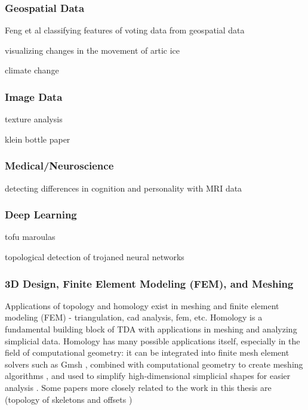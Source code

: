 \documentclass[ma]{uncgdissertationexp}
\theoremstyle{plain}
\theoremstyle{definition}
\theoremstyle{remark}
\begin{document}
\subsubsection{Geospatial Data}
\par Feng et al classifying features of voting data from geospatial data \cite{geospatial_voting}
\par visualizing changes in the movement of artic ice \cite{jocelyn_thesis}
\par climate change
\subsubsection{Image Data}
\par texture analysis \cite{chung2020smooth}
\par klein bottle paper
\subsubsection{Medical/Neuroscience}
\par detecting differences in cognition and personality with MRI data \cite{TDA_MRI}
\subsubsection{Deep Learning}
\par tofu maroulas \cite{oballe2021tofu}
\par topological detection of trojaned neural networks \cite{zheng2021topological}
\subsubsection{3D Design, Finite Element Modeling (FEM), and Meshing}
\par Applications of topology and homology exist in meshing and finite element modeling (FEM) - triangulation, cad analysis, fem, etc. Homology is a fundamental building block of TDA with applications in meshing and analyzing simplicial data. Homology has many possible applications itself, especially in the field of computational geometry: it can be integrated into finite mesh element solvers such as Gmsh \cite{homology_fem_computation}, combined with computational geometry to create meshing algorithms \cite{3d_vol_iso_mesh}, and used to simplify high-dimensional simplicial shapes for easier analysis \cite{efficient_homology_preserving}\cite{mesh_enhanced_persistent}. Some papers more closely related to the work in this thesis are (topology of skeletons and offsets \cite{efficient_homology_preserving})
\end{document}

